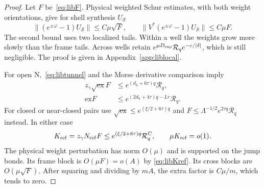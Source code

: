 \begin{proof}
Let $F$ be~\eqref{eq:libF}. Physical weighted Schur estimates, with
both weight orientations, give for shell synthesis $U_{\mathcal S}$
\begin{equation}\label{eq:libonetails}
 \|(e^{\pm\varphi}-1)U_{\mathcal S}\|\le C\mu\sqrt F,
 \qquad
 \|V^*(e^{\pm\varphi}-1)U_{\mathcal S}\|\le C\mu F.
\end{equation}
The second bound uses two localized tails. Within a well the
weights grow more slowly than the frame tails. Across wells retain
$e^{\mu D_{\rm cap}}\mathcal R_qe^{-c/|\delta|}$, which is still
negligible. The proof is given in Appendix~\ref{app:liblocal}.

For open N,~\eqref{eq:libtunnel} and the Morse derivative comparison
imply
\begin{equation}\label{eq:libkeyproducts}
 \begin{split}
 z_\gamma\sqrt{\mathrm{ex}}F
       &\le e^{(d_h+6\tau)q}\mathcal R_q,\\
 \mathrm{ex}F&\le e^{(2d_h+4\tau)q-Lr}\mathcal R_q.
 \end{split}
\end{equation}
For closed or near-closed pairs use
$\sqrt{\mathrm{ex}}\le e^{(\xi/2+6\tau)q}$ and
$F\le\Lambda^{-1/2}e^{2\tau q}\mathcal R_q$ instead.
In either case
\begin{equation}\label{eq:libKref}
 K_{\rm ref}=z_\gamma N_{\rm ref}F
       \le e^{(\xi/2+8\tau)q}\mathcal R_q^C,\qquad
 \mu K_{\rm ref}=o(1).
\end{equation}
The physical weight perturbation has norm $O(\mu)$ and is supported
on the jump bonds. Its frame block is $O(\mu F)=o(A)$ by
\eqref{eq:libKref}. Its cross blocks are $O(\mu\sqrt F)$.
After squaring and dividing by $mA$, the extra factor is $C\mu/m$,
which tends to zero.


\end{proof}
